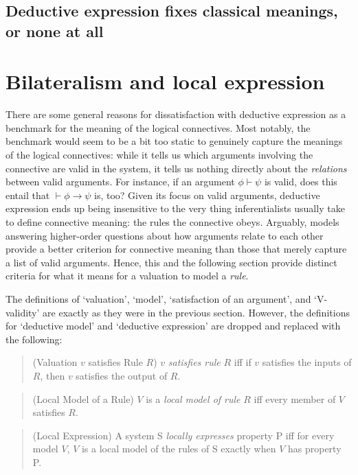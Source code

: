 \documentclass[]{article}
\begin{document}
\subsection{Deductive expression fixes classical meanings, or none at all}

\section{Bilateralism and local expression}
There are some general reasons for dissatisfaction with deductive expression as a benchmark for the meaning of the logical connectives. Most notably, the benchmark would seem to be a bit too static to genuinely capture the meanings of the logical connectives: while it tells us which arguments involving the connective are valid in the system, it tells us nothing directly about the \textit{relations} between valid arguments. For instance, if an argument $\phi\vdash\psi$ is valid, does this entail that $\vdash\phi\rightarrow\psi$ is, too? Given its focus on valid arguments, deductive expression ends up being insensitive to the very thing inferentialists usually take to define connective meaning: the rules the connective obeys. Arguably, models answering higher-order questions about how arguments relate to each other provide a better criterion for connective meaning than those that merely capture a list of valid arguments. Hence, this and the following section provide distinct criteria for what it means for a valuation to model a \textit{rule}.

The definitions of `valuation', `model', `satisfaction of an argument', and `V-validity' are exactly as they were in the previous section. However, the definitions for `deductive model' and `deductive expression' are dropped and replaced with the following:

\begin{quote}
(Valuation $v$ satisfies Rule $R$) $v$ \textit{satisfies rule} $R$ iff if $v$ satisfies the inputs of $R$, then $v$ satisfies the output of $R$.
\end{quote}
\begin{quote}
(Local Model of a Rule) $V$ is a \textit{local model of rule} $R$ iff every member of $V$ satisfies $R$.
\end{quote}

\begin{quote}
(Local Expression) A system S \textit{locally expresses} property P iff for every model $V$, $V$ is a local model of the rules of S exactly when $V$ has property P.
\end{quote}
\end{document}
